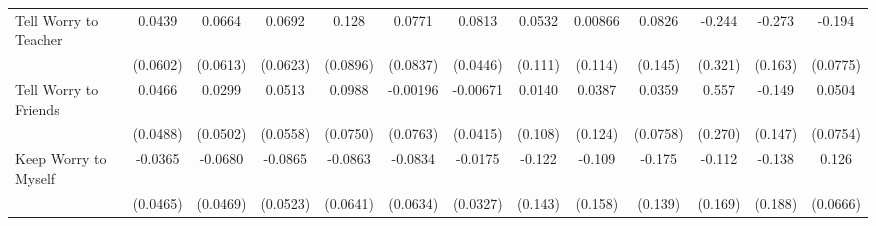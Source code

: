{\begin{tabular}{l*{12}{c}}
\addlinespace
Tell Worry to Teacher&      0.0439         &      0.0664         &      0.0692         &       0.128         &      0.0771         &      0.0813         &      0.0532         &     0.00866         &      0.0826         &      -0.244         &      -0.273         &      -0.194\sym{*}  \\
            &    (0.0602)         &    (0.0613)         &    (0.0623)         &    (0.0896)         &    (0.0837)         &    (0.0446)         &     (0.111)         &     (0.114)         &     (0.145)         &     (0.321)         &     (0.163)         &    (0.0775)         \\
\addlinespace
Tell Worry to Friends&      0.0466         &      0.0299         &      0.0513         &      0.0988         &    -0.00196         &    -0.00671         &      0.0140         &      0.0387         &      0.0359         &       0.557\sym{*}  &      -0.149         &      0.0504         \\
            &    (0.0488)         &    (0.0502)         &    (0.0558)         &    (0.0750)         &    (0.0763)         &    (0.0415)         &     (0.108)         &     (0.124)         &    (0.0758)         &     (0.270)         &     (0.147)         &    (0.0754)         \\
\addlinespace
Keep Worry to Myself&     -0.0365         &     -0.0680         &     -0.0865         &     -0.0863         &     -0.0834         &     -0.0175         &      -0.122         &      -0.109         &      -0.175         &      -0.112         &      -0.138         &       0.126         \\
            &    (0.0465)         &    (0.0469)         &    (0.0523)         &    (0.0641)         &    (0.0634)         &    (0.0327)         &     (0.143)         &     (0.158)         &     (0.139)         &     (0.169)         &     (0.188)         &    (0.0666)         \\
\bottomrule
\end{tabular}
}
